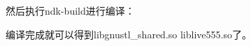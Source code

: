 \documentclass[12pt]{article}
\begin{document}
然后执行ndk-build进行编译：

\begin{Shaded}
\begin{Highlighting}[]
\end{Highlighting}
\end{Shaded}

编译完成就可以得到libgnustl\_shared.so liblive555.so了。
\end{document}
